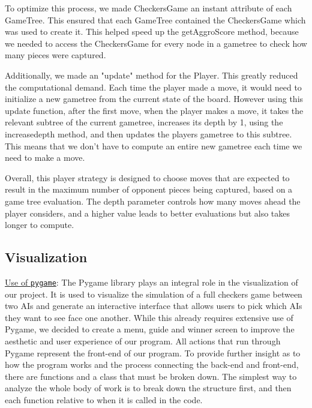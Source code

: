 \documentclass[fontsize=11pt]{article}
\begin{document}
To optimize this process, we made CheckersGame an instant attribute of each GameTree. This ensured that each GameTree contained the CheckersGame which was used to create it. This helped speed up the getAggroScore method, because we needed to access the CheckersGame for every node in a gametree to check how many pieces were captured. 

Additionally, we made an "update" method for the Player. This greatly reduced the computational demand. Each time the player made a move, it would need to initialize a new gametree from the current state of the board. However using this update function, after the first move, when the player makes a move, it takes the relevant subtree of the current gametree, increases its depth by 1, using the increasedepth method, and then updates the players gametree to this subtree. This means that we don't have to compute an entire new gametree each time we need to make a move.  


Overall, this player strategy is designed to choose moves that are expected to result in the maximum number of opponent pieces being captured, based on a game tree evaluation. The depth parameter controls how many moves ahead the player considers, and a higher value leads to better evaluations but also takes longer to compute.
\subsection*{Visualization}



\newline

\underline{Use of \texttt{pygame}}:
The Pygame library plays an integral role in the visualization of our project. It is used to visualize the simulation of a full checkers game between two AIs and generate an interactive interface that allows users to pick which AIs they want to see face one another. While this already requires extensive use of Pygame, we decided to create a menu, guide and winner screen to improve the aesthetic and user experience of our program. All actions that run through Pygame represent the front-end of our program. To provide further insight as to how the program works and the process connecting the back-end and front-end, there are functions and a class that must be broken down. The simplest way to analyze the whole body of work is to break down the structure first, and then each function relative to when it is called in the code. 
\end{document}
